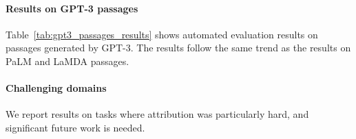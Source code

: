 \documentclass[11pt]{article}
\begin{document}
\begin{table}[!t]
\centering\small
{}
\caption{\textbf{Results on passages from GPT-3.} We report the automatic metrics: $\attrauto$, $\preslev$, and harmonic mean between the two ($\HM{}$). We show auto-AIS scores both before and after editing (before $\rightarrow$ edit), with respect to the attribution report $A$ produced by the model.
The results show similar trends as the results on passages from PaLM and LaMDA in Table~\ref{tab:main_results}.
}
\label{tab:gpt3_passages_results}
\end{table}


\paragraph{Results on GPT-3 passages}
Table~\ref{tab:gpt3_passages_results} shows automated evaluation results on passages generated by GPT-3.
The results follow the same trend as the results on PaLM and LaMDA passages.

\paragraph{Challenging domains}
We report results on tasks where attribution was particularly hard, and significant future work is needed.
\end{document}
